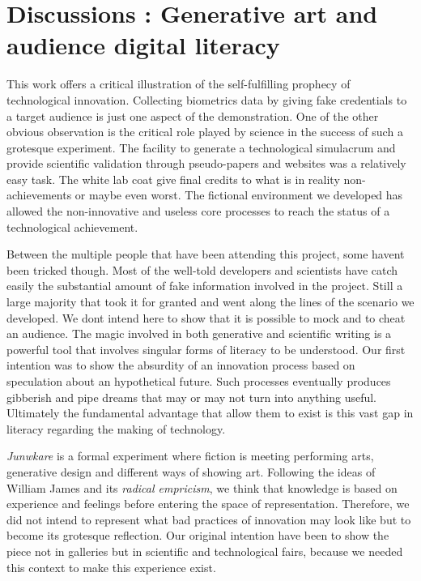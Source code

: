 \section{Discussions : Generative art and audience digital literacy}
This work offers a critical illustration of the self-fulfilling prophecy
of technological innovation. Collecting biometrics data by giving fake
credentials to a target audience is just one aspect of the
demonstration. One of the other obvious observation is the critical
role played by science in the success of such a grotesque experiment.
The facility to generate a technological simulacrum and provide
scientific validation through pseudo-papers and websites was a
relatively easy task. The white lab coat give final credits to what is
in reality non-achievements or maybe even worst. The fictional
environment we developed has allowed the non-innovative and useless
core processes to reach the status of a technological achievement.


\bigskip

Between the multiple people that have been attending this project, some
haven{\textquotesingle}t been tricked though. Most of the well-told
developers and scientists have catch easily the substantial amount of
fake information involved in the project. Still a large majority that
took it for granted and went along the lines of the scenario we
developed. We don{\textquotesingle}t intend here to show that it is
possible to mock and to cheat an audience. The magic involved in both
generative and scientific writing is a powerful tool that involves
singular forms of literacy to be understood. Our first intention was to
show the absurdity of an innovation process based on speculation about
an hypothetical future. Such processes eventually produces gibberish
and pipe dreams that may or may not turn into anything useful.
Ultimately the fundamental advantage that allow them to exist is this
vast gap in literacy regarding the making of technology.


\bigskip

\textit{Junwkare }is a formal experiment where fiction is meeting
performing arts, generative design and different ways of showing art.
Following the ideas of William James and its \textit{radical
empricism}, we think that knowledge is based on experience and feelings
before entering the space of representation. Therefore, we did not
intend to represent what bad practices of innovation may look like but
to become its grotesque reflection. Our original intention have been to
show the piece not in galleries but in scientific and technological
fairs, because we needed this context to make this experience exist.


